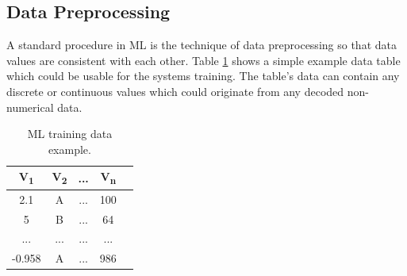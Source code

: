 \documentclass[MGS,Master,english]{twbook}%
\begin{document}
\subsection{Data Preprocessing} \label{ML::dataPreprocessing}
A standard procedure in \ac{ML} is the technique of data preprocessing so that data values are consistent with each other. Table \ref{table::PCGML::devExample::data} shows a simple example data table which could be usable for the systems training. The table’s data can contain any discrete or continuous values which could originate from any decoded non-numerical data.
\begin{table}[!htbp]
	\centering
	\begin{tabular}{|c|c|c|c|c|}
		\hline
		\textbf{V\textsubscript{1}} & \textbf{V\textsubscript{2}} & \textbf{...} & \textbf{V\textsubscript{n}} \\ \hline\hline
		 2.1         & A           & ...          & 100         \\ \hline
		 5           & B           & ...          & 64          \\ \hline
		 ...         & ...         & ...          & ...         \\ \hline
		-0.958         & A         & ...          & 986         \\ \hline
	\end{tabular}
	\caption{\ac{ML} training data example.}
	\label{table::PCGML::devExample::data}
\end{table}
\end{document}
